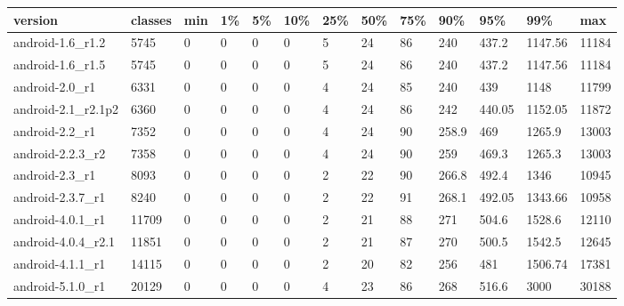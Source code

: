 \begin{tabular}{|l|l|l|l|l|l|l|l|l|l|l|l|l|}
\hline
version&classes&min&1\%&5\%&10\%&25\%&50\%&75\%&90\%&95\%&99\%&max\\
\hline
android-1.6\_r1.2&5745&0&0&0&0&5&24&86&240&437.2&1147.56&11184\\
\hline
android-1.6\_r1.5&5745&0&0&0&0&5&24&86&240&437.2&1147.56&11184\\
\hline
android-2.0\_r1&6331&0&0&0&0&4&24&85&240&439&1148&11799\\
\hline
android-2.1\_r2.1p2&6360&0&0&0&0&4&24&86&242&440.05&1152.05&11872\\
\hline
android-2.2\_r1&7352&0&0&0&0&4&24&90&258.9&469&1265.9&13003\\
\hline
android-2.2.3\_r2&7358&0&0&0&0&4&24&90&259&469.3&1265.3&13003\\
\hline
android-2.3\_r1&8093&0&0&0&0&2&22&90&266.8&492.4&1346&10945\\
\hline
android-2.3.7\_r1&8240&0&0&0&0&2&22&91&268.1&492.05&1343.66&10958\\
\hline
android-4.0.1\_r1&11709&0&0&0&0&2&21&88&271&504.6&1528.6&12110\\
\hline
android-4.0.4\_r2.1&11851&0&0&0&0&2&21&87&270&500.5&1542.5&12645\\
\hline
android-4.1.1\_r1&14115&0&0&0&0&2&20&82&256&481&1506.74&17381\\
\hline
android-5.1.0\_r1&20129&0&0&0&0&4&23&86&268&516.6&3000&30188\\
\hline
\end{tabular}
